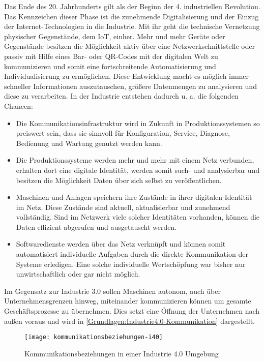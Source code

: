 Das Ende des 20. Jahrhunderts gilt als der Beginn der 4. industriellen Revolution. Das Kennzeichen dieser Phase ist die zunehmende Digitalisierung und der Einzug der Internet-Technologien in die Industrie. Mit ihr geht die technische Vernetzung physischer Gegenstände, dem \ac{IoT}, einher. Mehr und mehr Geräte oder Gegenstände besitzen die Möglichkeit aktiv über eine Netzwerkschnittstelle oder passiv mit Hilfe eines Bar- oder QR-Codes mit der digitalen Welt zu kommunizieren und somit eine fortschreitende Automatisierung und Individualisierung zu ermöglichen. Diese Entwicklung macht es möglich immer schneller Informationen auszutauschen, größere Datenmengen zu analysieren und diese zu verarbeiten. In der Industrie entstehen dadurch u. a. die folgenden Chancen:

\begin{itemize}
  \item Die Kommunikationsinfrastruktur wird in Zukunft in Produktionssystemen so preiswert sein, dass sie sinnvoll für Konfiguration, Service, Diagnose, Bedienung und Wartung genutzt werden kann.
  \item Die Produktionssysteme werden mehr und mehr mit einem Netz verbunden, erhalten dort eine digitale Identität, werden somit such- und analysierbar und besitzen die Möglichkeit Daten über sich selbst zu veröffentlichen. 
  \item Maschinen und Anlagen speichern ihre Zustände in ihrer digitalen Identität im Netz. Diese Zustände sind aktuell, aktualisierbar und zunehmend vollständig. Sind im Netzwerk viele solcher Identitäten vorhanden, können die Daten effizient abgerufen und ausgetauscht werden.
  \item Softwaredienste werden über das Netz verknüpft und können somit automatisiert individuelle Aufgaben durch die direkte Kommunikation der Systeme erledigen. Eine solche individuelle Wertschöpfung war bisher nur unwirtschaftlich oder gar nicht möglich.
\end{itemize}

Im Gegensatz zur Industrie 3.0 sollen Maschinen autonom, auch über Unternehmensgrenzen hinweg, miteinander kommunizieren können um gesamte Geschäftsprozesse zu übernehmen. Dies setzt eine Öffnung der Unternehmen nach außen voraus und wird in \autoref{Grundlagen:Industrie4.0-Kommunikation} dargestellt.

\begin{figure}[h]
  \centering
  \texttt{[image: kommunikationsbeziehungen-i40]}
  \caption{Kommunikationsbeziehungen in einer Industrie 4.0 Umgebung}
  \label{Grundlagen:Industrie4.0-Kommunikation}
\end{figure}

